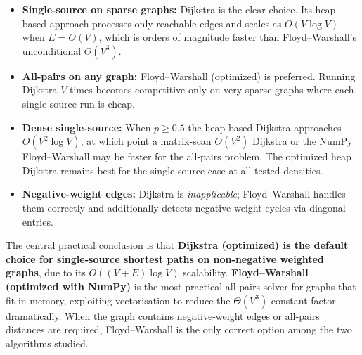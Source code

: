 \documentclass[12pt,a4paper]{article}
\begin{document}
	\begin{itemize}
		\item \textbf{Single-source on sparse graphs:} Dijkstra is the clear choice.
		Its heap-based approach processes only reachable edges and scales as
		$O(V\log V)$ when $E = O(V)$, which is orders of magnitude faster than
		Floyd--Warshall's unconditional $\Theta(V^3)$.
		\item \textbf{All-pairs on any graph:} Floyd--Warshall (optimized) is
		preferred. Running Dijkstra $V$ times becomes competitive only on very
		sparse graphs where each single-source run is cheap.
		\item \textbf{Dense single-source:} When $p \geq 0.5$ the heap-based
		Dijkstra approaches $O(V^2\log V)$, at which point a matrix-scan
		$O(V^2)$ Dijkstra or the NumPy Floyd--Warshall may be faster for the
		all-pairs problem. The optimized heap Dijkstra remains best for the
		single-source case at all tested densities.
		\item \textbf{Negative-weight edges:} Dijkstra is \emph{inapplicable};
		Floyd--Warshall handles them correctly and additionally detects
		negative-weight cycles via diagonal entries.
	\end{itemize}
	
	\noindent The central practical conclusion is that \textbf{Dijkstra (optimized)
		is the default choice for single-source shortest paths on non-negative
		weighted graphs}, due to its $O((V+E)\log V)$ scalability. \textbf{Floyd--Warshall
		(optimized with NumPy)} is the most practical all-pairs solver for graphs that
	fit in memory, exploiting vectorisation to reduce the $\Theta(V^3)$ constant
	factor dramatically. When the graph contains negative-weight edges or all-pairs
	distances are required, Floyd--Warshall is the only correct option among the two
	algorithms studied.
	
\end{document}
